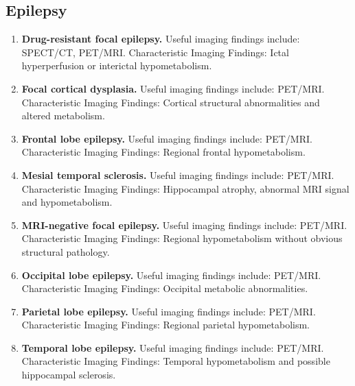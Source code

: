 \subsection{Epilepsy}
\begin{enumerate}[leftmargin=*,itemsep=0.45em,topsep=0.4em]
\item \textbf{Drug-resistant focal epilepsy.} Useful imaging findings include: SPECT/CT, PET/MRI. Characteristic Imaging Findings: Ictal hyperperfusion or interictal hypometabolism.
\item \textbf{Focal cortical dysplasia.} Useful imaging findings include: PET/MRI. Characteristic Imaging Findings: Cortical structural abnormalities and altered metabolism.
\item \textbf{Frontal lobe epilepsy.} Useful imaging findings include: PET/MRI. Characteristic Imaging Findings: Regional frontal hypometabolism.
\item \textbf{Mesial temporal sclerosis.} Useful imaging findings include: PET/MRI. Characteristic Imaging Findings: Hippocampal atrophy, abnormal MRI signal and hypometabolism.
\item \textbf{MRI-negative focal epilepsy.} Useful imaging findings include: PET/MRI. Characteristic Imaging Findings: Regional hypometabolism without obvious structural pathology.
\item \textbf{Occipital lobe epilepsy.} Useful imaging findings include: PET/MRI. Characteristic Imaging Findings: Occipital metabolic abnormalities.
\item \textbf{Parietal lobe epilepsy.} Useful imaging findings include: PET/MRI. Characteristic Imaging Findings: Regional parietal hypometabolism.
\item \textbf{Temporal lobe epilepsy.} Useful imaging findings include: PET/MRI. Characteristic Imaging Findings: Temporal hypometabolism and possible hippocampal sclerosis.
\end{enumerate}

